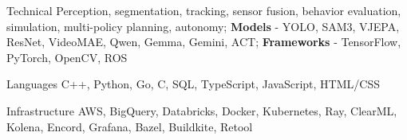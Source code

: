 \vspace{-3mm}

\begin{cvskills}

  \cvskill
	{Technical} %
	{Perception, segmentation, tracking, sensor fusion, behavior evaluation, simulation, multi-policy planning, autonomy; \textbf{Models} - YOLO, SAM3, VJEPA, ResNet, VideoMAE, Qwen, Gemma, Gemini, ACT; \textbf{Frameworks} - TensorFlow, PyTorch, OpenCV, ROS} %

  \cvskill
    {Languages} %
    {C++, Python, Go, C, SQL, TypeScript, JavaScript, HTML/CSS} %

	\cvskill
	{Infrastructure} %
	{AWS, BigQuery, Databricks, Docker, Kubernetes, Ray, ClearML, Kolena, Encord, Grafana, Bazel, Buildkite, Retool} %
\end{cvskills}
